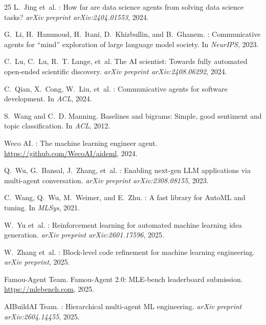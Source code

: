 \documentclass{article}
\begin{document}
\begin{thebibliography}{25}
L.~Jing et~al.
: How far are data science agents from solving data science tasks?
\newblock \emph{arXiv preprint arXiv:2404.01553}, 2024.

G.~Li, H.~Hammoud, H.~Itani, D.~Khizbullin, and B.~Ghanem.
: Communicative agents for ``mind'' exploration of large language model society.
\newblock In \emph{NeurIPS}, 2023.

C.~Lu, C.~Lu, R.~T. Lange, et~al.
\newblock The {AI} scientist: Towards fully automated open-ended scientific discovery.
\newblock \emph{arXiv preprint arXiv:2408.06292}, 2024.

C.~Qian, X.~Cong, W.~Liu, et~al.
: Communicative agents for software development.
\newblock In \emph{ACL}, 2024.

S.~Wang and C.~D. Manning.
\newblock Baselines and bigrams: Simple, good sentiment and topic classification.
\newblock In \emph{ACL}, 2012.

Weco AI.
: The machine learning engineer agent.
\newblock \url{https://github.com/WecoAI/aideml}, 2024.

Q.~Wu, G.~Bansal, J.~Zhang, et~al.
: Enabling next-gen {LLM} applications via multi-agent conversation.
\newblock \emph{arXiv preprint arXiv:2308.08155}, 2023.

C.~Wang, Q.~Wu, M.~Weimer, and E.~Zhu.
: A fast library for {AutoML} and tuning.
\newblock In \emph{MLSys}, 2021.

W.~Yu et~al.
: Reinforcement learning for automated machine learning idea generation.
\newblock \emph{arXiv preprint arXiv:2601.17596}, 2025.

W.~Zhang et~al.
: Block-level code refinement for machine learning engineering.
\newblock \emph{arXiv preprint}, 2025.

{Famou-Agent Team}.
\newblock Famou-{A}gent 2.0: {MLE}-bench leaderboard submission.
\newblock \url{https://mlebench.com}, 2025.

{AIBuildAI Team}.
: Hierarchical multi-agent {ML} engineering.
\newblock \emph{arXiv preprint arXiv:2604.14455}, 2025.


\end{thebibliography}
\end{document}
